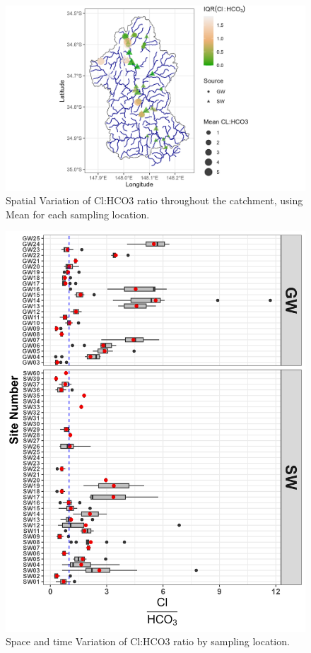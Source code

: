 \documentclass[, manuscript]{copernicus}
\begin{document}
\clearpage

\begin{figure}
\includegraphics[width=0.8\linewidth]{Figures/clhco3_map} \caption{Spatial Variation of Cl:HCO3 ratio throughout the catchment, using Mean for each sampling location.}\label{fig:Carbonate-map}
\end{figure}

\begin{figure}
\includegraphics[width=0.8\linewidth]{Figures/clhco3_plot} \caption{Space and time Variation of Cl:HCO3 ratio by sampling location.}\label{fig:Carbonate-boxplot}
\end{figure}
\end{document}

